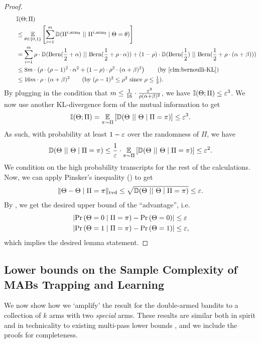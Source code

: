 \begin{proof}
	\begin{align*}
		\qquad & \II(\Theta; \Pi) \\
		&\leq \expectR{\theta \in \{0,1\}}{\sum_{i=1}^{m} \kl{\Pi^{i, \arm_2}}{\Pi^{i, \arm_2} \mid \Theta = \theta}}\\
		&= \sum_{i=1}^{m} \rho \cdot \kl{\bern{\frac{1}{2}+\alpha}}{\bern{\frac{1}{2}+\rho\cdot \alpha}} + (1-\rho)\cdot \kl{\bern{\frac{1}{2}}}{\bern{\frac{1}{2}+\rho\cdot (\alpha+\beta)}}\\
		&\leq 8m\cdot \paren{\rho\cdot (\rho-1)^2\cdot \alpha^2 + (1-\rho) \cdot \rho^2 \cdot (\alpha+\beta)^2} \tag{by \Cref{clm:bernoulli-KL}}\\
		&\leq 16 m\cdot \rho \cdot (\alpha+\beta)^2 \tag{by $(\rho-1)^2\leq \rho^2$ since $\rho\leq \frac{1}{2}$}.
	\end{align*}
	By plugging in the condition that $m\leq \frac{1}{16} \cdot \frac{\varepsilon^3}{\rho (\alpha+\beta)^2}$, we have $\mathbb{I}(\Theta; \Pi)\leq \varepsilon^3$. We now use another KL-divergence form of the mutual information to get
	\begin{align*}
		\mathbb{I}(\Theta; \Pi) = \operatorname*{{\mathbb{E}}}_{\pi\sim \Pi}\left[\mathbb{D}(\Theta~||~\Theta\mid \Pi=\pi)\right] \leq \varepsilon^3.
	\end{align*}
	As such, with probability at least $1-\varepsilon$ over the randomness of $\Pi$, we have
	\begin{align*}
		\mathbb{D}(\Theta~||~\Theta\mid \Pi=\pi)\leq \frac{1}{\varepsilon} \cdot  \operatorname*{{\mathbb{E}}}_{\pi\sim \Pi}\left[\mathbb{D}(\Theta~||~\Theta\mid \Pi=\pi)\right] \leq \varepsilon^2.
	\end{align*}
	We condition on the high probability transcripts for the rest of the calculations. Now, we can apply Pinsker's inequality () to get %
	\begin{align*}
		\|\Theta - \Theta\mid \Pi=\pi\|_{\mathrm{tvd}} \leq \sqrt{\mathbb{D}(\Theta~||~\Theta\mid \Pi=\pi)} \leq \varepsilon.
	\end{align*}
	By , we get the desired upper bound of the ``advantage'', i.e. 
	\begin{align*}
		& \card{\Pr\paren{\Theta=0\mid \Pi=\pi}-\Pr\paren{\Theta=0}}\leq \eps\\
		& \card{\Pr\paren{\Theta=1\mid \Pi=\pi}-\Pr\paren{\Theta=1}}\leq \eps,
	\end{align*} %
	which implies the desired lemma statement.
\end{proof}

\subsection{Lower bounds on the Sample Complexity of MABs Trapping and Learning}
\label{subsec:batch-arm-hardness}
We now show how we `amplify' the result for the double-armed bandits to a collection of $k$ arms with two \emph{special} arms. These results are similar both in spirit and in technicality to existing multi-pass lower bounds \cite{AWneurips22,AW23BestArm}, and we include the proofs for completeness.

